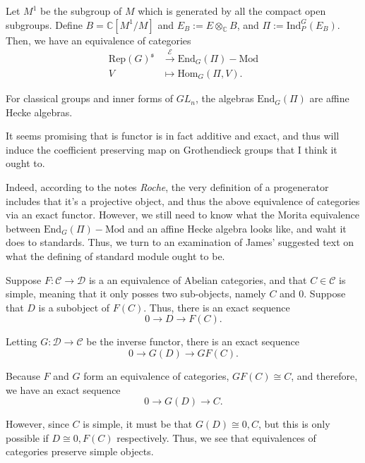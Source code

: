 \documentclass{memoir}
\newcommand{\mc}{\mathcal}
\newcommand{\mf}{\mathfrak}
\newcommand{\bc}{\mathbb{C}}
\newcommand{\tx}{\text}
\newcommand{\ten}{\otimes}
\theoremstyle{definition}
\begin{document}
		Let $M^1$ be the subgroup of $M$ which is generated by all the compact open subgroups.  
		Define $B=\bc[M^1/M]$ and $E_B:=E\ten_\bc B$, and $\Pi:=\tx{Ind}_P^G(E_B)$.  
		Then, we have an equivalence of categories
		\begin{align*}
			\tx{Rep}(G)^{\mf{s}}&\xrightarrow{\mc{E}}\tx{End}_G(\Pi)-\tx{Mod}\\
			V&\mapsto \tx{Hom}_G(\Pi, V).
		\end{align*}
	
	For classical groups and inner forms of $GL_n$, the algebras $\tx{End}_G(\Pi)$ are affine Hecke algebras.  
	
	It seems promising that is functor is in fact additive and exact, and thus will induce the coefficient preserving map on Grothendieck groups that I think it ought to. 
	
	Indeed, according to the notes \emph{Roche}, the very definition of a progenerator includes that it's a projective object, and thus the above equivalence of categories via an exact functor.  
	However, we still need to know what the Morita equivalence between $\tx{End}_G(\Pi)-\tx{Mod}$ and an affine Hecke algebra looks like, and waht it does to standards.  
	Thus, we turn to an examination of James' suggested text on what the defining of standard module ought to be.  
	
	Suppose $F:\mc{C}\to\mc{D}$ is a an equivalence of Abelian categories, and that $C\in \mc{C}$ is simple, meaning that it only posses two sub-objects, namely $C$ and 0.
	Suppose that $D$ is a subobject of $F(C)$.  
	Thus, there is an exact sequence
	$$0\to D\to F(C).$$
	
	Letting $G:\mc{D}\to\mc{C}$ be the inverse functor, there is an exact sequence
	$$0\to G(D)\to GF(C).$$
	
	Because $F$ and $G$ form an equivalence of categories, $GF(C)\cong C$, and therefore, we have an exact sequence
	$$0\to G(D)\to C.$$
	
	However, since $C$ is simple, it must be that $G(D)\cong 0, C$, but this is only possible if $D\cong 0, F(C)$ respectively.  
	Thus, we see that equivalences of categories preserve simple objects. 
	
	
	
	
	
	
	
	
	
	
	
	
	
	
	
	
	
\end{document}
